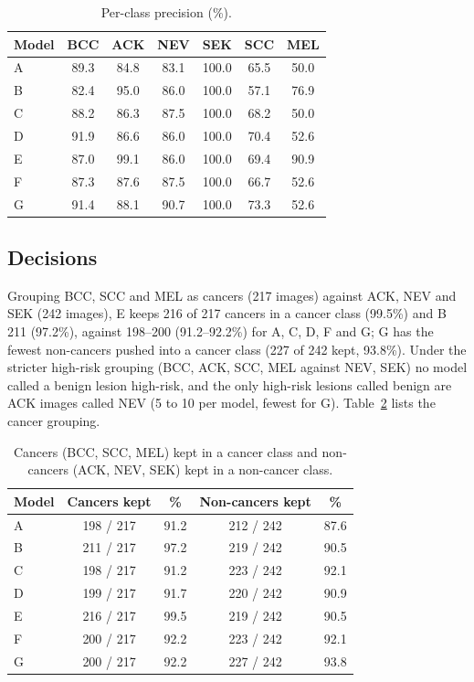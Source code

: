 \documentclass[conference]{IEEEtran}
\begin{document}
\begin{table}[!t]
\caption{Per-class precision (\%).}
\label{tab:prec}
\centering\scriptsize\setlength{\tabcolsep}{3pt}
\begin{tabular}{lcccccc}
\toprule
Model & BCC & ACK & NEV & SEK & SCC & MEL \\
\midrule
A & 89.3 & 84.8 & 83.1 & 100.0 & 65.5 & 50.0 \\
B & 82.4 & 95.0 & 86.0 & 100.0 & 57.1 & 76.9 \\
C & 88.2 & 86.3 & 87.5 & 100.0 & 68.2 & 50.0 \\
D & 91.9 & 86.6 & 86.0 & 100.0 & 70.4 & 52.6 \\
E & 87.0 & 99.1 & 86.0 & 100.0 & 69.4 & 90.9 \\
F & 87.3 & 87.6 & 87.5 & 100.0 & 66.7 & 52.6 \\
G & 91.4 & 88.1 & 90.7 & 100.0 & 73.3 & 52.6 \\
\bottomrule
\end{tabular}
\end{table}


\subsection{Decisions}
Grouping BCC, SCC and MEL as cancers (217 images) against ACK, NEV and SEK (242 images), E keeps 216 of 217 cancers in a cancer class (99.5\%) and B 211 (97.2\%), against 198--200 (91.2--92.2\%) for A, C, D, F and G; G has the fewest non-cancers pushed into a cancer class (227 of 242 kept, 93.8\%). Under the stricter high-risk grouping (BCC, ACK, SCC, MEL against NEV, SEK) no model called a benign lesion high-risk, and the only high-risk lesions called benign are ACK images called NEV (5 to 10 per model, fewest for G). Table~\ref{tab:risk} lists the cancer grouping.

\begin{table}[!t]
\caption{Cancers (BCC, SCC, MEL) kept in a cancer class and non-cancers (ACK, NEV, SEK) kept in a non-cancer class.}
\label{tab:risk}
\centering\scriptsize\setlength{\tabcolsep}{3pt}
\begin{tabular}{lcccc}
\toprule
Model & Cancers kept & \% & Non-cancers kept & \% \\
\midrule
A & 198 / 217 & 91.2 & 212 / 242 & 87.6 \\
B & 211 / 217 & 97.2 & 219 / 242 & 90.5 \\
C & 198 / 217 & 91.2 & 223 / 242 & 92.1 \\
D & 199 / 217 & 91.7 & 220 / 242 & 90.9 \\
E & 216 / 217 & 99.5 & 219 / 242 & 90.5 \\
F & 200 / 217 & 92.2 & 223 / 242 & 92.1 \\
G & 200 / 217 & 92.2 & 227 / 242 & 93.8 \\
\bottomrule
\end{tabular}
\end{table}
\end{document}
